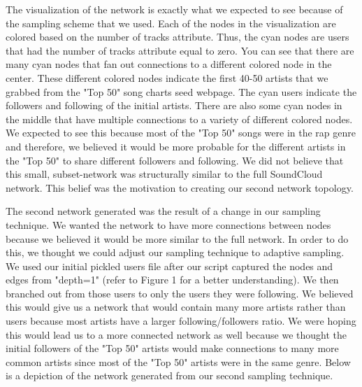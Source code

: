 \documentclass{article}
\begin{document}
The visualization of the network is exactly what we expected to see because of the sampling scheme that we used.  Each of the nodes in the visualization are colored based on the number of tracks attribute.  Thus, the cyan nodes are users that had the number of tracks attribute equal to zero.  You can see that there are many cyan nodes that fan out connections to a different colored node in the center.  These different colored nodes indicate the first 40-50 artists that we grabbed from the "Top 50" song charts seed webpage.  The cyan users indicate the followers and following of the initial artists.  There are also some cyan nodes in the middle that have multiple connections to a variety of different colored nodes.  We expected to see this because most of the "Top 50" songs were in the rap genre and therefore, we believed it would be more probable for the different artists in the "Top 50" to share different followers and following.  We did not believe that this small, subset-network was structurally similar to the full SoundCloud network.  This belief was the motivation to creating our second network topology.

The second network generated was the result of a change in our sampling technique.  We wanted the network to have more connections between nodes because we believed it would be more similar to the full network.  In order to do this, we thought we could adjust our sampling technique to adaptive sampling.  We used our initial pickled users file after our script captured the nodes and edges from "depth=1" (refer to Figure 1 for a better understanding).  We then branched out from those users to only the users they were following.  We believed this would give us a network that would contain many more artists rather than users because most artists have a larger following/followers ratio.  We were hoping this would lead us to a more connected network as well because we thought the initial followers of the "Top 50" artists would make connections to many more common artists since most of the "Top 50" artists were in the same genre.  Below is a depiction of the network generated from our second sampling technique.
\end{document}
